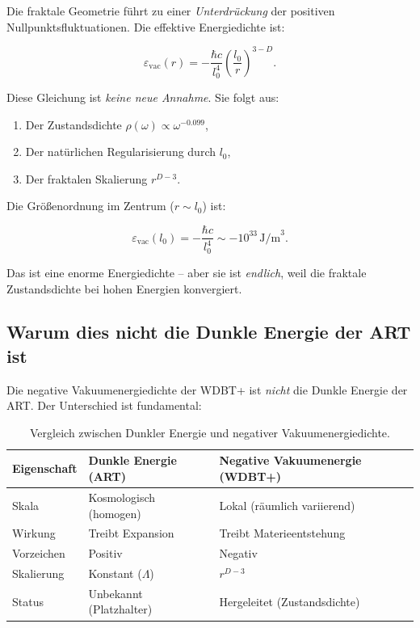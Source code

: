 Die fraktale Geometrie führt zu einer \emph{Unterdrückung} der positiven Nullpunktsfluktuationen. Die effektive Energiedichte ist:

\begin{equation}
\varepsilon_{\text{vac}}(r) = -\frac{\hbar c}{l_0^4} \left( \frac{l_0}{r} \right)^{3-D}. \tag{2.6}
\end{equation}

Diese Gleichung ist \emph{keine neue Annahme}. Sie folgt aus:

\begin{enumerate}
    \item Der Zustandsdichte \(\rho(\omega) \propto \omega^{-0.099}\),
    \item Der natürlichen Regularisierung durch \(l_0\),
    \item Der fraktalen Skalierung \(r^{D-3}\).
\end{enumerate}

Die Größenordnung im Zentrum (\(r \sim l_0\)) ist:

\begin{equation}
\varepsilon_{\text{vac}}(l_0) = -\frac{\hbar c}{l_0^4} \sim -10^{33} \, \text{J/m}^3. \tag{2.7}
\end{equation}

Das ist eine enorme Energiedichte – aber sie ist \emph{endlich}, weil die fraktale Zustandsdichte bei hohen Energien konvergiert.

\subsection{Warum dies nicht die Dunkle Energie der ART ist}

Die negative Vakuumenergiedichte der WDBT+ ist \emph{nicht} die Dunkle Energie der ART. Der Unterschied ist fundamental:

\begin{table}[ht]
\centering
\small
\setlength{\tabcolsep}{4pt}
\begin{tabular}{|p{4.0cm}|p{4.0cm}|p{4.0cm}|}
\hline
\textbf{Eigenschaft} & \textbf{Dunkle Energie (ART)} & \textbf{Negative Vakuumenergie (WDBT+)} \\
\hline
Skala & Kosmologisch (homogen) & Lokal (räumlich variierend) \\
Wirkung & Treibt Expansion & Treibt Materieentstehung \\
Vorzeichen & Positiv & Negativ \\
Skalierung & Konstant (\(\Lambda\)) & \(r^{D-3}\) \\
Status & Unbekannt (Platzhalter) & Hergeleitet (Zustandsdichte) \\
\hline
\end{tabular}
\caption{Vergleich zwischen Dunkler Energie und negativer Vakuumenergiedichte.}
\end{table}

